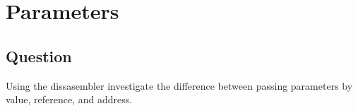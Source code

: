 \section{Parameters}
    \subsection*{Question}
        Using the dissasembler investigate the difference between passing
        parameters by value, reference, and address.
